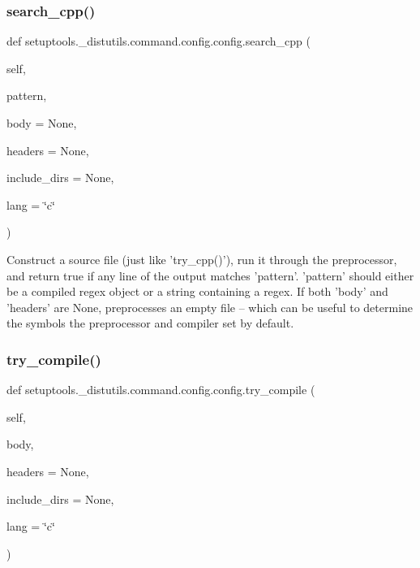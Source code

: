 \subsubsection{\texorpdfstring{search\+\_\+cpp()}{search\_cpp()}}
{\footnotesize\ttfamily def setuptools.\+\_\+distutils.\+command.\+config.\+config.\+search\+\_\+cpp (\begin{DoxyParamCaption}\item[{}]{self,  }\item[{}]{pattern,  }\item[{}]{body = {\ttfamily None},  }\item[{}]{headers = {\ttfamily None},  }\item[{}]{include\+\_\+dirs = {\ttfamily None},  }\item[{}]{lang = {\ttfamily \char`\"{}c\char`\"{}} }\end{DoxyParamCaption})}

\begin{DoxyVerb}Construct a source file (just like 'try_cpp()'), run it through
the preprocessor, and return true if any line of the output matches
'pattern'.  'pattern' should either be a compiled regex object or a
string containing a regex.  If both 'body' and 'headers' are None,
preprocesses an empty file -- which can be useful to determine the
symbols the preprocessor and compiler set by default.
\end{DoxyVerb}
 \mbox{\label{classsetuptools_1_1__distutils_1_1command_1_1config_1_1config_af2bccea2d146f0d32149df4882eaabfb}} 
\subsubsection{\texorpdfstring{try\+\_\+compile()}{try\_compile()}}
{\footnotesize\ttfamily def setuptools.\+\_\+distutils.\+command.\+config.\+config.\+try\+\_\+compile (\begin{DoxyParamCaption}\item[{}]{self,  }\item[{}]{body,  }\item[{}]{headers = {\ttfamily None},  }\item[{}]{include\+\_\+dirs = {\ttfamily None},  }\item[{}]{lang = {\ttfamily \char`\"{}c\char`\"{}} }\end{DoxyParamCaption})}

